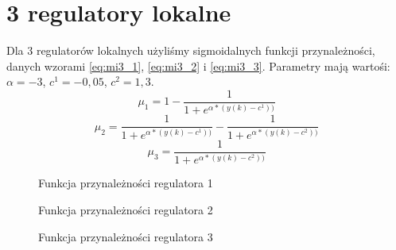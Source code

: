 \section{3 regulatory lokalne}
Dla 3 regulatorów lokalnych użyliśmy sigmoidalnych funkcji przynależności, danych wzorami \ref{eq:mi3_1}, \ref{eq:mi3_2} i \ref{eq:mi3_3}. Parametry mają wartośi: $\alpha = -3$, $c^1 = -0,05$, $c^2=1,3$.
\begin{equation} \label{eq:mi3_1}
\mu_1 = 1 - \frac{1}{1+e^{\alpha * (y(k)-c^1))}}
\end{equation}
\begin{equation} \label{eq:mi3_2}
\mu_2 = \frac{1}{1+e^{\alpha * (y(k)-c^1))}} - \frac{1}{1+e^{\alpha * (y(k)-c^2))}}
\end{equation}
\begin{equation} \label{eq:mi3_3}
\mu_3 = \frac{1}{1+e^{\alpha * (y(k)-c^2))}}
\end{equation}

\begin{figure}[H]
\centering
{}
\caption{Funkcja przynależności regulatora 1}
\label{fig:mi3_1}
\end{figure}

\begin{figure}[H]
\centering
{}
\caption{Funkcja przynależności regulatora 2}
\label{fig:mi3_2}
\end{figure}

\begin{figure}[H]
\centering
{}
\caption{Funkcja przynależności regulatora 3}
\label{fig:mi3_3}
\end{figure}

